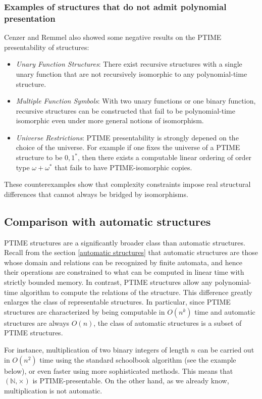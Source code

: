 \documentclass{pracalicmgr2025}
\theoremstyle{plain}            %
\theoremstyle{remark}           %
\theoremstyle{definition}       %
\begin{document}
\subsubsection{Examples of structures that do not admit polynomial presentation}

Cenzer and Remmel also showed some negative results on the PTIME presentability of structures:
\begin{itemize}
\item \emph{Unary Function Structures}: There exist recursive structures with a single unary function that are not recursively isomorphic to any polynomial-time structure.
\item \emph{Multiple Function Symbols}: With two unary functions or one binary function, recursive structures can be constructed that fail to be polynomial-time isomorphic even under more general notions of isomorphism.
\item \emph{Universe Restrictions}: PTIME presentability is strongly depened on the choice of the universe. For example if one fixes the universe of a PTIME structure to be ${0,1}^*$, then there exists a computable linear ordering of order type $\omega + \omega^*$ that fails to have PTIME-isomorphic copies.
\end{itemize}

These counterexamples show that complexity constraints impose real structural differences that cannot always be bridged by isomorphisms.

\subsection{Comparison with automatic structures}

PTIME structures are a significantly broader class than automatic structures. Recall from the section \ref{automatic structures} that automatic structures are those whose domain and relations can be recognized by finite automata, and hence their operations are constrained to what can be computed in linear time with strictly bounded memory. In contrast, PTIME structures allow any polynomial-time algorithm to compute the relations of the structure. This difference greatly enlarges the class of representable structures. In particular, since PTIME structures are characterized by being computable in $O(n^k)$ time and automatic structures are always $O(n)$, the class of automatic structures is a subset of PTIME structures.

For instance, multiplication of two binary integers of length $n$ can be carried out in $O(n^2)$ time using the standard schoolbook algorithm (see the example below), or even faster using more sophisticated methods. This means that $(\mathbb{N}, \times)$ is PTIME-presentable. On the other hand, as we already know, multiplication is not automatic.
\end{document}
